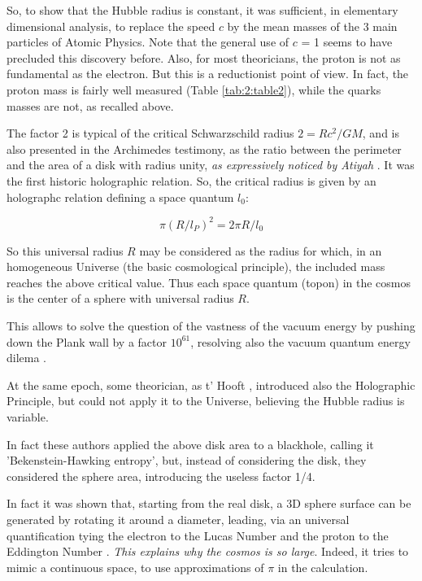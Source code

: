 \documentclass[a4paper,9pt]{article}
\begin{document}
So, to show that the Hubble radius is constant, it was sufficient, in elementary dimensional analysis, to replace the speed $c$ by the mean masses of the 3 main particles of Atomic Physics. Note that the general use of $c$ = 1 seems to have precluded this discovery before. Also, for most theoricians, the proton is not as fundamental as the electron. But this is a reductionist point of view. In fact, the proton mass is fairly well measured (Table \ref{tab:2:table2}), while the quarks masses are not, as recalled above.
 
 
    The factor 2 is typical of the critical Schwarzschild radius $2 = Rc^2/GM$, and is also presented in the Archimedes testimony, as the ratio between the perimeter and the area of a disk with radius unity, \textit {as expressively noticed by Atiyah }. It was the first historic holographic relation. So, the critical radius is given by an holographc relation defining a space quantum $l_0$:
    
    \begin{equation}
        \pi (R/l_P)^2 = 2\pi R/l_0
    \end{equation}
    
    So this universal radius $R$ may be considered as the radius for which, in an homogeneous Universe (the basic cosmological principle), the included mass reaches the above critical value\cite{Sanchez}. Thus each space quantum (topon) in the cosmos is the center of a sphere with universal radius $R$.  
    
    
    This allows to solve the question of the vastness of the vacuum energy by pushing down the Plank wall by a factor $10^61$, resolving also the vacuum quantum energy dilema  \cite{Sanchez} . 
    
    
    At the same epoch, some theorician, as t' Hooft \cite{Hooft}, introduced also the Holographic Principle, but could not apply it to the Universe, believing the Hubble radius is variable.
    
    
    In fact these authors applied the above disk area to a blackhole, calling it 'Bekenstein-Hawking entropy'\cite{Bekenstein}, but, instead of considering the disk, they considered the sphere area, introducing the useless factor 1/4. 
    
    
    In fact it was shown that, starting from the real disk, a 3D sphere surface can be generated by rotating it around a diameter, leading, via an universal quantification tying the electron to the Lucas Number and the proton to the Eddington Number \cite{Sanchez}. \textit {This explains why the cosmos is so large}. Indeed, it tries to mimic a continuous space, to use approximations of $\pi$ in  the calculation.
    
\end{document}
